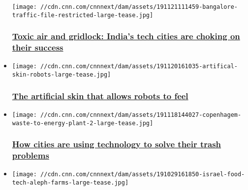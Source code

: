 \begin{itemize}
  \texttt{[image: //cdn.cnn.com/cnnnext/dam/assets/191121111459-bangalore-traffic-file-restricted-large-tease.jpg]}

  \hypertarget{toxic-air-and-gridlock-indias-tech-cities-are-choking-on-their-success}{%
  \subsubsection{\texorpdfstring{\href{/2019/12/03/tech/india-pollution-crisis-tech-cities/index.html}{Toxic
  air and gridlock: India's tech cities are choking on their
  success}}{Toxic air and gridlock: India's tech cities are choking on their success}}\label{toxic-air-and-gridlock-indias-tech-cities-are-choking-on-their-success}}
\item
  \href{/2019/11/28/business/robot-artificial-skin-scn/index.html}{}

  \texttt{[image: //cdn.cnn.com/cnnnext/dam/assets/191120161035-artifical-skin-robots-large-tease.jpg]}

  \hypertarget{the-artificial-skin-that-allows-robots-to-feel}{%
  \subsubsection{\texorpdfstring{\href{/2019/11/28/business/robot-artificial-skin-scn/index.html}{The
  artificial skin that allows robots to
  feel}}{The artificial skin that allows robots to feel}}\label{the-artificial-skin-that-allows-robots-to-feel}}
\item
  \href{/2019/11/27/business/technology-and-trash-intl/index.html}{}

  \texttt{[image: //cdn.cnn.com/cnnnext/dam/assets/191118144027-copenhagem-waste-to-energy-plant-2-large-tease.jpg]}

  \hypertarget{how-cities-are-using-technology-to-solve-their-trash-problems}{%
  \subsubsection{\texorpdfstring{\href{/2019/11/27/business/technology-and-trash-intl/index.html}{How
  cities are using technology to solve their trash
  problems}}{How cities are using technology to solve their trash problems}}\label{how-cities-are-using-technology-to-solve-their-trash-problems}}
\item
  \href{/2019/11/04/business/israel-food-technology/index.html}{}

  \texttt{[image: //cdn.cnn.com/cnnnext/dam/assets/191029161850-israel-food-tech-aleph-farms-large-tease.jpg]}


\end{itemize}
